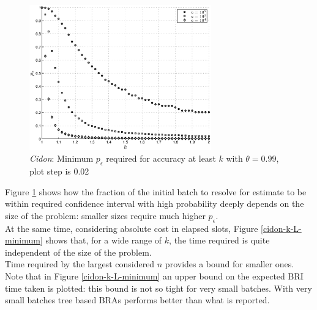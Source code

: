 \documentclass[11pt,a4paper,twoside,openright]{book}
\newcommand{\pc}{p_{\epsilon}}
\begin{document}
\begin{figure}[htbp]
\begin{center}
\includegraphics[width=0.7\textwidth]{matlab/Cidon/cidon-k-p-minimum}
\caption[\emph{Cidon}: Minimum $\pc$ required for accuracy  $k$]{\emph{Cidon}: Minimum $\pc$ required for accuracy at least $k$ with $\theta=0.99$, plot step is 0.02}
\label{cidon-k-p-minimum}
\end{center}
\end{figure}

Figure \ref{cidon-k-p-minimum} shows how the fraction of the initial batch to resolve for estimate to be within  required confidence interval with high probability deeply depends on the size of the problem: smaller sizes require much higher $\pc$.\\
At the same time, considering absolute cost in elapsed slots, Figure  \ref{cidon-k-L-minimum} shows that, for a wide range of $k$, the time required is quite independent of the size of the problem.\\
Time required by the largest considered $n$ provides a  bound for smaller ones.\\
Note that in Figure  \ref{cidon-k-L-minimum} an upper bound on the expected BRI time taken is plotted: this bound is not so tight for very small batches. With very small batches tree based BRAs performs better than what is reported.   
\end{document}
